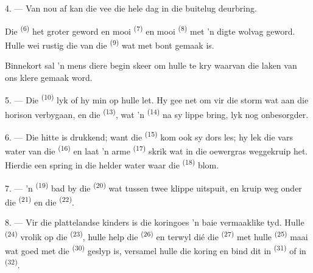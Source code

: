 4. --- Van nou af kan die vee die hele dag in die buitelug deurbring.

Die  \textsuperscript{(6)} het groter geword en mooi 
\textsuperscript{(7)} en mooi  \textsuperscript{(8)} met 'n digte wolvag
geword. Hulle wei rustig die  van die 
\textsuperscript{(9)} wat met  bont gemaak is.

Binnekort sal 'n mens  diere begin skeer om hulle  te kry
waarvan die laken van ons klere gemaak word.

\VUsaut{5.0mm}
\VUsaut{3.4mm}

5. --- Die  \textsuperscript{(10)} lyk of hy min op hulle let. Hy gee net
om vir die storm wat aan die horison verbygaan, en die 
\textsuperscript{(13)}, wat 'n  \textsuperscript{(14)} na sy lippe
bring, lyk nog onbesorgder.

6. --- Die hitte is drukkend; want die  \textsuperscript{(15)} kom ook sy
dors les; hy lek die vars water van die  \textsuperscript{(16)} en
laat 'n arme  \textsuperscript{(17)} skrik wat in die oewergras
weggekruip het. Hierdie een spring in die helder water waar die 
\textsuperscript{(18)} blom.

7. --- 'n  \textsuperscript{(19)} bad by die 
\textsuperscript{(20)} wat tussen twee klippe uitspuit, en kruip weg onder die
 \textsuperscript{(21)} en die 
\textsuperscript{(22)}.

\VUsaut{5.0mm}
\VUsaut{3.4mm}

8. --- Vir die plattelandse kinders is die koringoes 'n baie vermaaklike tyd. Hulle
\textsuperscript{(24)} vrolik op die 
\textsuperscript{(23)}, hulle help die  \textsuperscript{(26)} en terwyl
dié die  \textsuperscript{(27)} met hulle 
\textsuperscript{(25)} maai wat goed met die  \textsuperscript{(30)}
geslyp is, versamel hulle die koring en bind dit in 
\textsuperscript{(31)} of in  \textsuperscript{(32)}.

